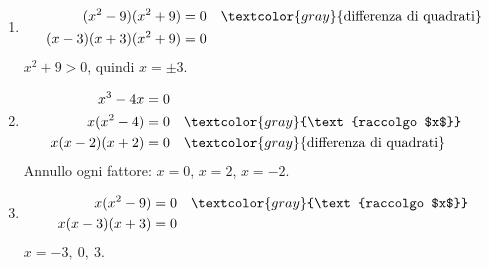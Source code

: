 \begin{question}[ID=4.1, subtitle={Equazioni di grado superiore al secondo}, difficulty=facile, tags={equazioni di grado superiore}]
\begin{explanation}
\begin{enumerate}
    \item \[\begin{aligned}
    (x^2-9)(x^2+9) &= 0 && \textcolor{gray}{\text{differenza di quadrati}}\\
    (x-3)(x+3)(x^2+9) &= 0
    \end{aligned}\]
    $x^2+9>0$, quindi $x=\pm3$.
    \item \[\begin{aligned}
    x^3-4x &= 0\\
    x(x^2-4) &= 0 && \textcolor{gray}{\text{raccolgo $x$}}\\
    x(x-2)(x+2) &= 0 && \textcolor{gray}{\text{differenza di quadrati}}
    \end{aligned}\]
    Annullo ogni fattore: $x=0$, $x=2$, $x=-2$.
    \item \[\begin{aligned}
    x(x^2-9) &= 0 && \textcolor{gray}{\text{raccolgo $x$}}\\
    x(x-3)(x+3) &= 0
    \end{aligned}\]
    $x=-3,\ 0,\ 3$.
\end{enumerate}
\end{explanation}
\end{question}


